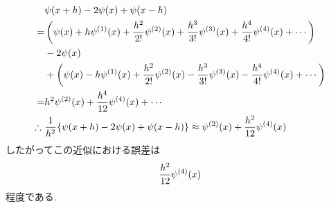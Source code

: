 \begin{qparts}
    \begin{align}
        &\psi(x+h)-2\psi(x)+\psi(x-h) \notag \\
        = &\left(\psi(x)+h\psi^{(1)}(x)+\frac{h^2}{2!}\psi^{(2)}(x)+\frac{h^3}{3!}\psi^{(3)}(x)+\frac{h^4}{4!}\psi^{(4)}(x)+\cdots\right) \notag \\
        &-2\psi(x) \notag \\
        &+\left(\psi(x)-h\psi^{(1)}(x)+\frac{h^2}{2!}\psi^{(2)}(x)-\frac{h^3}{3!}\psi^{(3)}(x)-\frac{h^4}{4!}\psi^{(4)}(x)+\cdots\right) \notag \\
        = &h^2\psi^{(2)}(x)+\frac{h^4}{12}\psi^{(4)}(x)+\cdots \notag \\
        \therefore\ &\frac{1}{h^2}\lbrace\psi(x+h)-2\psi(x)+\psi(x-h)\rbrace\approx\psi^{(2)}(x)+\frac{h^2}{12}\psi^{(4)}(x) \notag
    \end{align}
    したがってこの近似における誤差は
    \begin{equation}
        \frac{h^2}{12}\psi^{(4)}(x) \notag
    \end{equation}
    程度である. 

    \qpart
\end{qparts}
